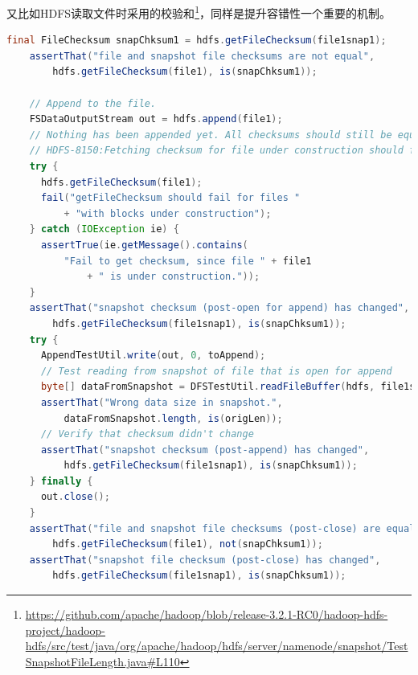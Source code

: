 \documentclass[logo,reportComp]{thesis}
\begin{document}
又比如HDFS读取文件时采用的校验和\footnote{\url{https://github.com/apache/hadoop/blob/release-3.2.1-RC0/hadoop-hdfs-project/hadoop-hdfs/src/test/java/org/apache/hadoop/hdfs/server/namenode/snapshot/TestSnapshotFileLength.java\#L110}}，同样是提升容错性一个重要的机制。
\begin{lstlisting}[language=java]
    final FileChecksum snapChksum1 = hdfs.getFileChecksum(file1snap1);
    assertThat("file and snapshot file checksums are not equal",
        hdfs.getFileChecksum(file1), is(snapChksum1));

    // Append to the file.
    FSDataOutputStream out = hdfs.append(file1);
    // Nothing has been appended yet. All checksums should still be equal.
    // HDFS-8150:Fetching checksum for file under construction should fail
    try {
      hdfs.getFileChecksum(file1);
      fail("getFileChecksum should fail for files "
          + "with blocks under construction");
    } catch (IOException ie) {
      assertTrue(ie.getMessage().contains(
          "Fail to get checksum, since file " + file1
              + " is under construction."));
    }
    assertThat("snapshot checksum (post-open for append) has changed",
        hdfs.getFileChecksum(file1snap1), is(snapChksum1));
    try {
      AppendTestUtil.write(out, 0, toAppend);
      // Test reading from snapshot of file that is open for append
      byte[] dataFromSnapshot = DFSTestUtil.readFileBuffer(hdfs, file1snap1);
      assertThat("Wrong data size in snapshot.",
          dataFromSnapshot.length, is(origLen));
      // Verify that checksum didn't change
      assertThat("snapshot checksum (post-append) has changed",
          hdfs.getFileChecksum(file1snap1), is(snapChksum1));
    } finally {
      out.close();
    }
    assertThat("file and snapshot file checksums (post-close) are equal",
        hdfs.getFileChecksum(file1), not(snapChksum1));
    assertThat("snapshot file checksum (post-close) has changed",
        hdfs.getFileChecksum(file1snap1), is(snapChksum1));
\end{lstlisting}
\end{document}
